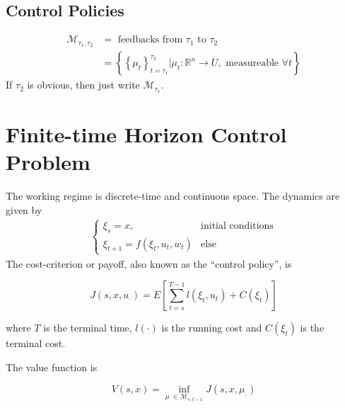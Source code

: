 \subsection{Control Policies}
\begin{align*}
\mathcal{M}_{\tau_1,\tau_2} &= \text{~feedbacks~from~} \tau_1 \text{~to~} \tau_2 \\
&= \left\lbrace\left\lbrace\mu_t\right\rbrace_{t=\tau_1}^{\tau_2} | \mu_t: \mathbb{R}^n \to U, \text{~measureable~} \forall t\right\rbrace
\end{align*}
If $\tau_2$ is obvious, then just write $\mathcal{M}_{\tau_1}$.

\section{Finite-time Horizon Control Problem}
The working regime is discrete-time and continuous space.
The dynamics are given by
\begin{align*}
\begin{cases}
\xi_s = x, & \text{initial conditions} \\
\xi_{t+1} = f(\xi_t,u_t,w_t) & \text{else}
\end{cases}
\end{align*}
The cost-criterion or payoff, also known as the ``control policy'', is

\begin{equation*}
J(s,x,u_\cdot) = E\left[\sum_{t=s}^{T-1} l(\xi_t,u_t) + C(\xi_t)\right]
\end{equation*}

where $T$ is the terminal time, $l(\cdot)$ is the running cost and $C(\xi_t)$ is the terminal cost.

The value function is

\begin{equation*}
V(s,x) = \inf_{\mu_\cdot\in\mathcal{M}_{s,t-1}}J(s,x,\mu_\cdot)
\end{equation*}%
